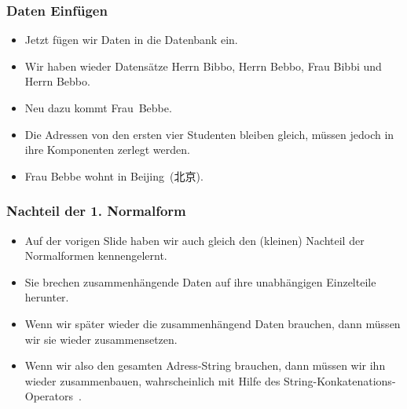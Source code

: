 \documentclass[aspectratio=169,mathserif,notheorems]{beamer}%
\begin{document}
%
%
\begin{frame}[t]%
\frametitle{Daten Einfügen}%
\parbox{0.435\linewidth}{\small%
\begin{itemize}%
%
\item Jetzt fügen wir Daten in die Datenbank ein.%
%
\item<2-> Wir haben wieder Datensätze Herrn Bibbo, Herrn Bebbo, Frau Bibbi und Herrn Bebbo.%
%
\item<3-> Neu dazu kommt Frau~Bebbe.%
%
\item<4-> Die Adressen von den ersten vier Studenten bleiben gleich, müssen jedoch in ihre Komponenten zerlegt werden.%
%
\item<5-> Frau Bebbe wohnt in Beijing~(北京).%
%
\end{itemize}%
}%
%
%
%
%
\end{frame}%
%
%
\begin{frame}[t]%
\frametitle{Nachteil der 1. Normalform}%
\begin{itemize}%
%
\item Auf der vorigen Slide haben wir auch gleich den (kleinen) Nachteil der Normalformen kennengelernt.%
%
\item<2-> Sie brechen zusammenhängende Daten auf ihre unabhängigen Einzelteile herunter.%
%
\item<3-> Wenn wir später wieder die zusammenhängend Daten  brauchen, dann müssen wir sie wieder zusammensetzen.%
%
\item<4-> Wenn wir also den gesamten Adress-String brauchen, dann müssen wir ihn wieder zusammenbauen, wahrscheinlich mit Hilfe des String-Konkatenations-Operators~\sqlil{||}\cite{PGDG:PD:SFAO}.%
%
\end{itemize}%
\end{frame}%
%
%
\end{document}
